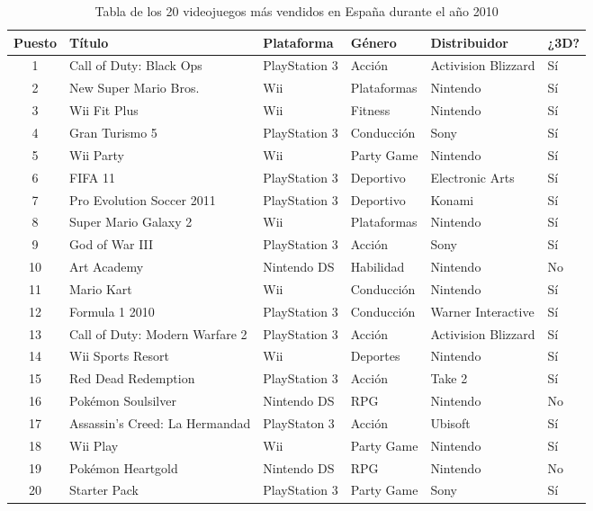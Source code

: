 \begin{table}[h]
  \begin{center}
  \begin{tabular}{| c |m{4cm}|m{2.5cm}|m{2cm}|m{3cm}|m{1cm}|}
    \hline
    \textbf{Puesto} & \textbf{Título} & \textbf{Plataforma} & \textbf{Género} & \textbf{Distribuidor} & \textbf{¿3D?} \\
    \hline
    1 & Call of Duty: Black Ops & PlayStation 3 & Acción & Activision Blizzard & Sí \\
    \hline
    2 & New Super Mario Bros. & Wii & Plataformas & Nintendo & Sí \\
    \hline
    3 & Wii Fit Plus & Wii & Fitness & Nintendo & Sí \\
    \hline
    4 & Gran Turismo 5 & PlayStation 3 & Conducción & Sony & Sí \\
    \hline
    5 & Wii Party & Wii & Party Game & Nintendo & Sí \\
    \hline
    6 & FIFA 11 & PlayStation 3 & Deportivo & Electronic Arts & Sí \\
    \hline
    7 & Pro Evolution Soccer 2011 & PlayStation 3 & Deportivo & Konami & Sí \\
    \hline
    8 & Super Mario Galaxy 2 & Wii & Plataformas & Nintendo & Sí \\
    \hline
    9 & God of War III & PlayStation 3 & Acción & Sony & Sí \\
    \hline
    10 & Art Academy & Nintendo DS & Habilidad & Nintendo & No \\
    \hline
    11 & Mario Kart & Wii & Conducción & Nintendo & Sí \\
    \hline
    12 & Formula 1 2010 & PlayStation 3 & Conducción & Warner Interactive & Sí \\
    \hline
    13 & Call of Duty: Modern Warfare 2 & PlayStation 3 & Acción & Activision Blizzard & Sí \\
    \hline
    14 & Wii Sports Resort & Wii & Deportes & Nintendo & Sí \\
    \hline
    15 & Red Dead Redemption & PlayStation 3 & Acción & Take 2 & Sí \\
    \hline
    16 & Pokémon Soulsilver & Nintendo DS & RPG & Nintendo & No \\
    \hline
    17 & Assassin's Creed: La Hermandad & PlayStaton 3 & Acción & Ubisoft & Sí \\
    \hline
    18 & Wii Play & Wii & Party Game & Nintendo & Sí \\
    \hline
    19 & Pokémon Heartgold & Nintendo DS & RPG & Nintendo & No \\
    \hline
    20 & Starter Pack & PlayStation 3 & Party Game & Sony & Sí \\
    \hline
  \end{tabular}
\end{center}
\caption{Tabla de los 20 videojuegos más vendidos en España durante el año 2010}
\label{tab:ventas2010}
\end{table}

